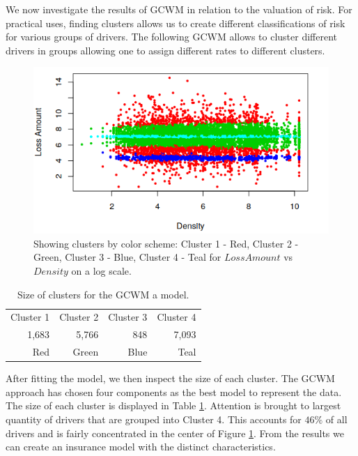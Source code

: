 \documentclass[11pt,letterpaper]{article}
\numberwithin{equation}{section}
\numberwithin{equation}{section}
\numberwithin{equation}{section}
\begin{document}
	We now investigate the results of GCWM in relation to the valuation of risk. For practical uses, finding clusters allows us to create different classifications of risk for various groups of drivers. The following GCWM allows to cluster different drivers in groups allowing one to assign different rates to different clusters.
\begin{figure}[!htb]
\caption{Showing clusters by color scheme: Cluster 1 - Red, Cluster 2 - Green, Cluster 3 - Blue, Cluster 4 - Teal for $LossAmount$ vs $Density$ on a log scale.}
\label{fig:vet1}
\begin{center}
\includegraphics[scale=0.83]{SeverityPlot}
\end{center}
\end{figure}
\begin{table}[!htb]
\centering
\caption{Size of clusters for the GCWM a model.}
\label{table:sizeSev}
\begin{tabular}{rrrr}
\hline\hline
Cluster 1   & Cluster 2  & Cluster 3   & Cluster 4    \\
1,683 & 5,766 & 848 & 7,093 \\
Red & Green & Blue & Teal \\
\hline\hline
\end{tabular}
\end{table}

After fitting the model, we then inspect the size of each cluster. The GCWM approach has chosen four components as the best model to represent the data. The size of each cluster is displayed in Table \ref{table:sizeSev}. Attention is brought to largest quantity  of drivers that are grouped into Cluster 4. This accounts for $ 46 \% $ of all drivers and is fairly concentrated in the center of Figure \ref{fig:vet1}. From the results we can create an insurance model with the distinct characteristics.
\end{document}
